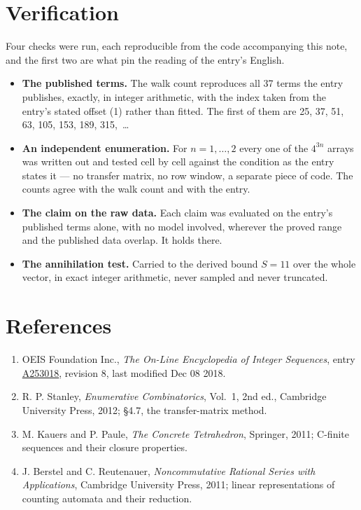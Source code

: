 \documentclass[11pt]{article}
\theoremstyle{definition}
\begin{document}
\section{Verification}

Four checks were run, each reproducible from the code accompanying this note, and the first two are what pin the reading of the entry's English.

\begin{itemize}

\item {\bfseries The published terms.} The walk count reproduces all 37 terms the entry publishes, exactly, in integer arithmetic, with the index taken from the entry's stated offset (1) rather than fitted. The first of them are 25, 37, 51, 63, 105, 153, 189, 315,~\dots

\item {\bfseries An independent enumeration.} For $n = 1,\dots,2$ every one of the $4^{3n}$ arrays was written out and tested cell by cell against the condition as the entry states it --- no transfer matrix, no row window, a separate piece of code. The counts agree with the walk count and with the entry.

\item {\bfseries The claim on the raw data.} Each claim was evaluated on the entry's published terms alone, with no model involved, wherever the proved range and the published data overlap. It holds there.

\item {\bfseries The annihilation test.} Carried to the derived bound $S = 11$ over the whole vector, in exact integer arithmetic, never sampled and never truncated.

\end{itemize}

\section{References}

\begin{enumerate}

\item OEIS Foundation Inc., \emph{The On-Line Encyclopedia of Integer Sequences}, entry \href{https://oeis.org/A253018}{A253018}, revision 8, last modified Dec 08 2018.

\item R. P. Stanley, \emph{Enumerative Combinatorics}, Vol.~1, 2nd ed., Cambridge University Press, 2012; \S4.7, the transfer-matrix method.

\item M. Kauers and P. Paule, \emph{The Concrete Tetrahedron}, Springer, 2011; C-finite sequences and their closure properties.

\item J. Berstel and C. Reutenauer, \emph{Noncommutative Rational Series with Applications}, Cambridge University Press, 2011; linear representations of counting automata and their reduction.

\end{enumerate}
\end{document}
